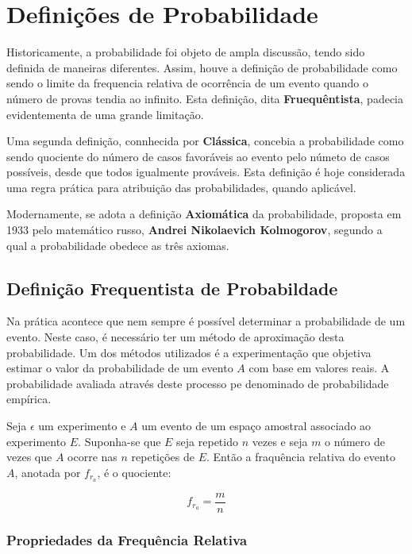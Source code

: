 \section{Definições de Probabilidade}
 
\inic Historicamente, a probabilidade foi objeto de ampla discussão, tendo sido definida de maneiras diferentes. Assim, houve a definição de probabilidade como sendo o limite da frequencia relativa de ocorrência de um evento quando o número de provas tendia ao infinito. Esta definição, dita \textbf{Fruequêntista}, padecia evidentementa de uma grande limitação.\vskip0.3cm
 
\inic Uma segunda definição, connhecida por \textbf{Clássica}, concebia a probabilidade como sendo quociente do número de casos favoráveis ao evento pelo númeto de casos possíveis, desde que todos igualmente prováveis. Esta definição é hoje considerada uma regra prática para atribuição das probabilidades, quando aplicável.\vskip0.3cm
 
 
\inic Modernamente, se adota a definição \textbf{Axiomática} da probabilidade, proposta em 1933 pelo matemático russo, \textbf{Andrei Nikolaevich Kolmogorov}, segundo a qual a probabilidade obedece as três axiomas.
 
 
\subsection{Definição Frequentista de Probabildade}

\inic Na prática acontece que nem sempre é possível determinar a probabilidade de um evento. Neste caso, é necessário ter um método de aproximação desta probabilidade. Um dos métodos utilizados é a experimentação que objetiva estimar o valor da probabilidade de um evento $A$ com base em valores reais. A probabilidade avaliada através deste processo pe denominado de probabilidade empírica.\vskip0.3cm

\inic Seja $\epsilon$ um experimento e $A$ um evento de um espaço amostral associado ao experimento $E$. Suponha-se que $E$ seja repetido $n$ vezes e seja $m$ o número de vezes que $A$ ocorre nas $n$ repetições de $E$. Então a fraquência relativa do evento $A$, anotada por $f_{r}_{a}$, é o quociente:
 
\begin{equation}
     f_{r_{a}}= \frac{m}{n}
\end{equation}
 
 
\newpage 
\subsubsection{Propriedades da Frequência Relativa} 

